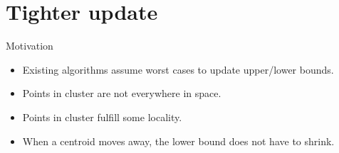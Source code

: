 \documentclass[10pt, compress]{beamer}
\newcommand{\x}{\vec{x}}
\newcommand{\lx}{l(\x)}
\newcommand{\ux}{u(\x)}
\newcommand{\lux}{lu(\x)}
\begin{document}



\section{Tighter update}

\begin{frame}{Motivation}
  \begin{itemize}
    \item Existing algorithms assume worst cases to update upper/lower bounds.
    \item Points in cluster are not everywhere in space.
    \item Points in cluster fulfill some locality.
    \item When a centroid moves away, the lower bound does not have to shrink.
  \end{itemize}
  \begin{center}
    
  \end{center}
\end{frame}
\end{document}
